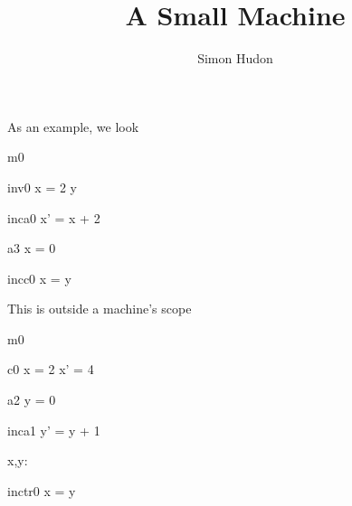 \documentclass[12pt]{amsart}
\title{A Small Machine}
\author{Simon Hudon}
\date{} %
\begin{document}
\maketitle

As an example, we look

\begin{machine}{m0}


\begin{invariant}{inv0}
	x = 2 \cdot y
\end{invariant}

\begin{evassignment}{inc}{a0}
	x' = x + 2
\end{evassignment}

\begin{initialization}{a3}
	x = 0
\end{initialization}


\begin{cschedule}{inc}{c0}
	x = y
\end{cschedule}

\end{machine}

This is outside a machine's scope

\begin{machine}{m0}

\begin{constraint}{c0}
	x = 2 \implies x' = 4
\end{constraint}

\begin{initialization}{a2}
	y = 0
\end{initialization}

\begin{evassignment}{inc}{a1}
	y' = y + 1
\end{evassignment}

\begin{variable}
	x,y: \Int
\end{variable}

\begin{transient}{inc}{tr0}
	x = y
\end{transient}

\end{machine}
\end{document}

